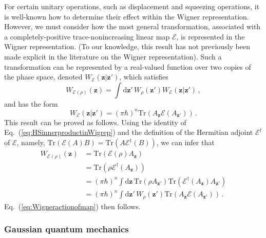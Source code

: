 \documentclass[pra,superscriptaddress,nofootinbib,12pt]{revtex4-2}
\begin{document}
For certain unitary operations, such as displacement and squeezing
operations, it is well-known how to determine their effect
within the Wigner representation.
However, we must consider how the most general transformation, associated
with a completely-positive trace-nonincreasing linear map
$\mathcal{E}$, is represented in the Wigner representation.  (To our knowledge, this result has
not previously been made explicit in the literature on the Wigner representation).  Such a
transformation can be represented by a real-valued function over two copies of the phase space, denoted
 $W_{\mathcal{E}}(\mathbf{z}|\mathbf{z}')$, which satisfies
\begin{equation}
  W_{\mathcal{E}(\rho)}(\mathbf{z})=\int
  \mathrm{d}\mathbf{z}'\, W_{\rho}(\mathbf{z}')W_{\mathcal{E}}(\mathbf{z}|\mathbf{z}')\,,
  \label{eq:Wigneractionofmap}
\end{equation}
and has the form
\begin{equation}
  W_{\mathcal{E}}(\mathbf{z}|\mathbf{z}')=(\pi \hbar)^n\mathrm{Tr}\left( A_{\mathbf{z}}\mathcal{E}(A_{\mathbf{z}'})\right)\,.
\end{equation}
This result can be proved as follows.  Using the identity of Eq.~(\ref{eq:HSinnerproductinWigrep}) and the definition of the Hermitian adjoint $\mathcal{E}^{\dag}$ of $\mathcal{E}$, namely, $\mathrm{Tr}(\mathcal{E}(A)B)=\mathrm{Tr}(A\mathcal{E}^{\dag}(B))$, we can infer that
\begin{align}
  W_{\mathcal{E}(\rho)}(\mathbf{z})
  & =\mathrm{Tr}\left( \mathcal{E}(\rho)A_{\mathbf{z}}\right)  \\
  & =\mathrm{Tr}\left( \rho\mathcal{E}^{\dag }(A_{\mathbf{z}})\right)  \\
  & =(\pi \hbar)^n\int \mathrm{d}\mathbf{z}\,\mathrm{Tr}\left( \rho A_{\mathbf{z}'}\right)
  \mathrm{Tr}\left( \mathcal{E}^{\dagger}(A_{\mathbf{z}})A_{\mathbf{z}'}\right)  \\
  & =(\pi \hbar)^n\int \mathrm{d}\mathbf{z}'\, W_{\rho}(\mathbf{z}')
  \mathrm{Tr}\left( A_{\mathbf{z}}\mathcal{E}(A_{\mathbf{z}'})\right) \,.
\end{align}
Eq.~(\ref{eq:Wigneractionofmap}) then follows.

\subsubsection{Gaussian quantum mechanics}
\end{document}
